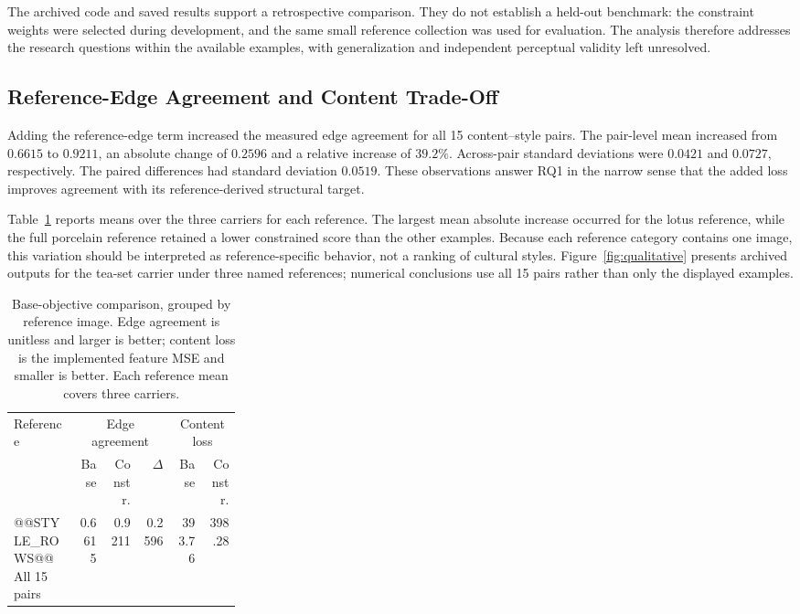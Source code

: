 The archived code and saved results support a retrospective comparison. They do not establish a held-out benchmark: the constraint weights were selected during development, and the same small reference collection was used for evaluation. The analysis therefore addresses the research questions within the available examples, with generalization and independent perceptual validity left unresolved.

\subsection{Reference-Edge Agreement and Content Trade-Off}
Adding the reference-edge term increased the measured edge agreement for all 15 content--style pairs. The pair-level mean increased from $0.6615$ to $0.9211$, an absolute change of $0.2596$ and a relative increase of $39.2\%$. Across-pair standard deviations were $0.0421$ and $0.0727$, respectively. The paired differences had standard deviation $0.0519$. These observations answer RQ1 in the narrow sense that the added loss improves agreement with its reference-derived structural target.

Table~\ref{tab:main} reports means over the three carriers for each reference. The largest mean absolute increase occurred for the lotus reference, while the full porcelain reference retained a lower constrained score than the other examples. Because each reference category contains one image, this variation should be interpreted as reference-specific behavior, not a ranking of cultural styles. Figure~\ref{fig:qualitative} presents archived outputs for the tea-set carrier under three named references; numerical conclusions use all 15 pairs rather than only the displayed examples.

\begin{table}[t]
\centering
\caption{Base-objective comparison, grouped by reference image. Edge agreement is unitless and larger is better; content loss is the implemented feature MSE and smaller is better. Each reference mean covers three carriers.}
\label{tab:main}
\small
\begin{tabular}{@{}p{0.29\linewidth}rrrrr@{}}
\toprule
Reference & \multicolumn{3}{c}{Edge agreement} & \multicolumn{2}{c}{Content loss}\\
\cmidrule(lr){2-4}\cmidrule(l){5-6}
 & Base & Constr. & $\Delta$ & Base & Constr.\\
\midrule
@@STYLE_ROWS@@
\midrule
All 15 pairs & 0.6615 & 0.9211 & 0.2596 & 393.76 & 398.28\\
\bottomrule
\end{tabular}
\end{table}

